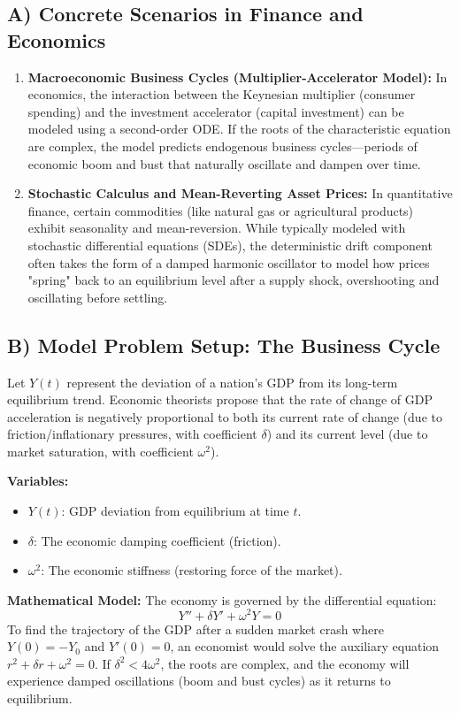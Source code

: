 \documentclass[11pt]{article}
\begin{document}
\subsection{A) Concrete Scenarios in Finance and Economics}
\begin{enumerate}
    \item \textbf{Macroeconomic Business Cycles (Multiplier-Accelerator Model):} In economics, the interaction between the Keynesian multiplier (consumer spending) and the investment accelerator (capital investment) can be modeled using a second-order ODE. If the roots of the characteristic equation are complex, the model predicts endogenous business cycles—periods of economic boom and bust that naturally oscillate and dampen over time.
    \item \textbf{Stochastic Calculus and Mean-Reverting Asset Prices:} In quantitative finance, certain commodities (like natural gas or agricultural products) exhibit seasonality and mean-reversion. While typically modeled with stochastic differential equations (SDEs), the deterministic drift component often takes the form of a damped harmonic oscillator to model how prices "spring" back to an equilibrium level after a supply shock, overshooting and oscillating before settling.
\end{enumerate}

\subsection{B) Model Problem Setup: The Business Cycle}
Let $Y(t)$ represent the deviation of a nation's GDP from its long-term equilibrium trend. Economic theorists propose that the rate of change of GDP acceleration is negatively proportional to both its current rate of change (due to friction/inflationary pressures, with coefficient $\delta$) and its current level (due to market saturation, with coefficient $\omega^2$).

\textbf{Variables:}
\begin{itemize}
    \item $Y(t)$: GDP deviation from equilibrium at time $t$.
    \item $\delta$: The economic damping coefficient (friction).
    \item $\omega^2$: The economic stiffness (restoring force of the market).
\end{itemize}

\textbf{Mathematical Model:}
The economy is governed by the differential equation:
\[ Y'' + \delta Y' + \omega^2 Y = 0 \]
To find the trajectory of the GDP after a sudden market crash where $Y(0) = -Y_0$ and $Y'(0) = 0$, an economist would solve the auxiliary equation $r^2 + \delta r + \omega^2 = 0$. If $\delta^2 < 4\omega^2$, the roots are complex, and the economy will experience damped oscillations (boom and bust cycles) as it returns to equilibrium.
\end{document}

